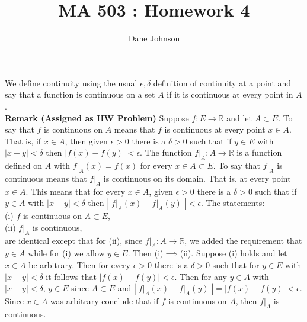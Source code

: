 \documentclass[a4paper]{article}
\title{MA 503 : Homework 4}
\author{Dane Johnson}
\begin{document}
\maketitle


We define continuity using the usual $\epsilon, \delta$ definition of continuity at a point and say that a function is continuous on a set $A$ if it is continuous at every point in $A$. \\

{\bf Remark (Assigned as HW Problem)} Suppose $f : E \rightarrow \mathbb{R}$ and let $A\subset E$. To say that $f$ is continuous on $A$ means that $f$ is continuous at every point $x \in A$. That is, if $x \in A$, then given $\epsilon > 0$  there is a $\delta > 0$ such that if $y \in E$ with $|x-y|<\delta$ then $|f(x) - f(y)| < \epsilon$. The function $f\rvert_A : A \rightarrow \mathbb{R}$ is a function defined on $A$ with $f\rvert_A(x) = f(x)$ for every $x \in A \subset E$. To say that $f\rvert_A$ is continuous means that $f\rvert_A$ is continuous on its domain. That is, at every point $x \in A$. This means that for every $x \in A$, given $\epsilon > 0$ there is a $\delta > 0$ such that if $y \in A$ with $|x-y| < \delta$ then $|\;f\rvert_A(x) - f\rvert_A(y)\;| < \epsilon$. The statements:\\

(i) $f$ is continuous on $A \subset E$,\\
(ii) $f\rvert_A$ is continuous,\\

are identical except that for (ii), since $f\rvert_A : A \rightarrow \mathbb{R}$, we added the requirement that $y \in A$ while for (i) we allow $y \in E$. Then (i)$\implies$(ii). Suppose (i) holds and let $x \in A$ be arbitrary. Then for every $\epsilon > 0$ there is a $\delta>0$ such that for $y \in E$ with $|x-y|<\delta$ it follows that $|f(x) - f(y)| < \epsilon$. Then for any $y \in A$ with $|x-y|<\delta$, $y \in E$ since $A \subset E$ and $|\;f\rvert_A(x) - f\rvert_A(y)\;| = |f(x) - f(y)| < \epsilon$. Since $x \in A$ was arbitrary conclude that if $f$ is continuous on $A$, then $f\rvert_A$ is continuous. \\
\end{document}

